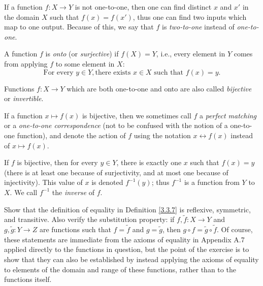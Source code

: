 \setcounter{theorem}{15}
\begin{remark}\label{3.3.16}
If a function \(f : X \to Y\) is not one-to-one, then one can find distinct \(x\) and \(x'\) in the domain \(X\) such that \(f(x) = f(x')\), thus one can find two inputs which map to one output.
Because of this, we say that \(f\) is \emph{two-to-one} instead of \emph{one-to-one}.
\end{remark}

\begin{definition}\label{3.3.17}
A function \(f\) is \emph{onto} (or \emph{surjective}) if \(f(X) = Y\), i.e., every element in \(Y\) comes from applying \(f\) to some element in \(X\):
\[
    \text{For every } y \in Y, \text{there exists } x \in X \text{ such that } f(x) = y.
\]
\end{definition}

\setcounter{theorem}{19}
\begin{definition}\label{3.3.20}
Functions \(f : X \to Y\) which are both one-to-one and onto are also called \emph{bijective} or \emph{invertible}.
\end{definition}

\setcounter{theorem}{22}
\begin{remark}\label{3.3.23}
If a function \(x \mapsto f(x)\) is bijective, then we sometimes call \(f\) a \emph{perfect matching} or a \emph{one-to-one correspondence} (not to be confused with the notion of a one-to-one function), and denote the action of \(f\) using the notation \(x \leftrightarrow f(x)\) instead of \(x \mapsto f(x)\).
\end{remark}

\begin{note}
If \(f\) is bijective, then for every \(y \in Y\), there is exactly one \(x\) such that \(f(x) = y\) (there is at least one because of surjectivity, and at most one because of injectivity).
This value of \(x\) is denoted \(f^{-1}(y)\); thus \(f^{-1}\) is a function from \(Y\) to \(X\).
We call \(f^{-1}\) the \emph{inverse} of \(f\).
\end{note}

\exercisesection

\begin{exercise}\label{ex 3.3.1}
Show that the definition of equality in Definition \ref{3.3.7} is reflexive, symmetric, and transitive.
Also verify the substitution property: if \(f, \tilde{f} : X \to Y\) and \(g, \tilde{g} : Y \to Z\) are functions such that \(f = \tilde{f}\) and \(g = \tilde{g}\), then \(g \circ f = \tilde{g} \circ \tilde{f}\).
Of course, these statements are immediate from the axioms of equality in Appendix A.7 applied directly to the functions in question, but the point of the exercise is to show that they can also be established by instead applying the axioms of equality to elements of the domain and range of these functions, rather than to the functions itself.
\end{exercise}

